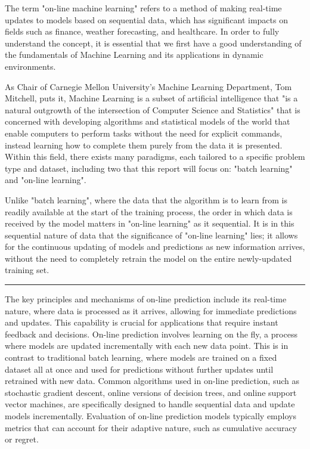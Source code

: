 \documentclass[11pt]{article} %
\theoremstyle{plain}
\theoremstyle{definition}
\begin{document}
The term "on-line machine learning" refers to a method of making real-time updates to models based on sequential data, which has significant impacts on fields such as finance, weather forecasting, and healthcare. In order to fully understand the concept, it is essential that we first have a good understanding of the fundamentals of Machine Learning and its applications in dynamic environments.

As Chair of Carnegie Mellon University's Machine Learning Department, Tom Mitchell, puts it, Machine Learning is a subset of artificial intelligence that "is a natural outgrowth of the intersection of Computer Science and Statistics" \cite{mitchell:2006} that is concerned with developing algorithms and statistical models of the world that enable computers to perform tasks without the need for explicit commands, instead learning how to complete them purely from the data it is presented. Within this field, there exists many paradigms, each tailored to a specific problem type and dataset, including two that this report will focus on: "batch learning" and "on-line learning". 

Unlike "batch learning", where the data that the algorithm is to learn from is readily available at the start of the training process, the order in which data is received by the model matters in "on-line learning" as it sequential. It is in this sequential nature of data that the significance of "on-line learning" lies; it allows for the continuous updating of models and predictions as new information arrives, without the need to completely retrain the model on the entire newly-updated training set. 


\noindent\rule{\textwidth}{0.1pt}

The key principles and mechanisms of on-line prediction include its real-time nature, where data is processed as it arrives, allowing for immediate predictions and updates. This capability is crucial for applications that require instant feedback and decisions. On-line prediction involves learning on the fly, a process where models are updated incrementally with each new data point. This is in contrast to traditional batch learning, where models are trained on a fixed dataset all at once and used for predictions without further updates until retrained with new data. Common algorithms used in on-line prediction, such as stochastic gradient descent, online versions of decision trees, and online support vector machines, are specifically designed to handle sequential data and update models incrementally. Evaluation of on-line prediction models typically employs metrics that can account for their adaptive nature, such as cumulative accuracy or regret.
\end{document}
